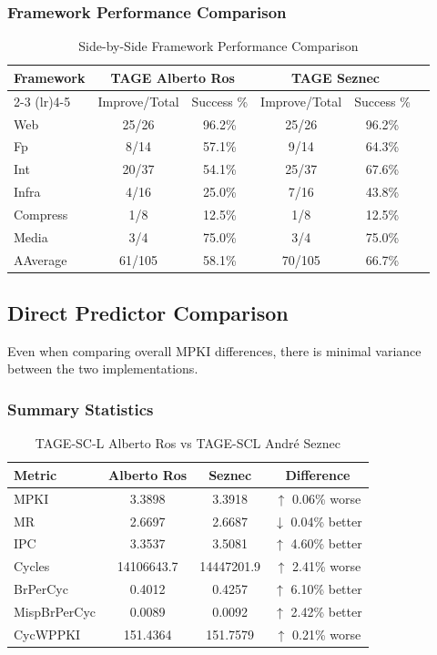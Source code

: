 \documentclass[11pt,a4paper]{article}
\begin{document}
\subsubsection{Framework Performance Comparison}

\begin{table}[h]
\centering
\caption{Side-by-Side Framework Performance Comparison}
\begin{tabular}{lccccc}
\toprule
\textbf{Framework} & \multicolumn{2}{c}{\textbf{TAGE Alberto Ros}} & \multicolumn{2}{c}{\textbf{TAGE Seznec}} \\
\cmidrule(lr){2-3} \cmidrule(lr){4-5}
 & Improve/Total & Success \% & Improve/Total & Success \% \\
\midrule
Web        & 25/26  & 96.2\%  & 25/26  & 96.2\% \\
Fp         & 8/14   & 57.1\%  & 9/14   & 64.3\% \\
Int        & 20/37  & 54.1\%  & 25/37  & 67.6\% \\
Infra      & 4/16   & 25.0\%  & 7/16   & 43.8\% \\
Compress   & 1/8    & 12.5\%  & 1/8    & 12.5\% \\
Media      & 3/4    & 75.0\%  & 3/4    & 75.0\% \\
\midrule
AAverage    & 61/105 & 58.1\% & 70/105 & 66.7\% \\
\bottomrule
\end{tabular}
\end{table}

\subsection{Direct Predictor Comparison}
Even when comparing overall MPKI differences, there is minimal variance between the two implementations.

\subsubsection{Summary Statistics}

\begin{table}[h]
\centering
\caption{TAGE-SC-L Alberto Ros vs TAGE-SCL André Seznec}
\begin{tabular}{lccc}
\toprule
\textbf{Metric} & \textbf{Alberto Ros} & \textbf{Seznec} & \textbf{Difference} \\
\midrule
MPKI         & 3.3898  & 3.3918  & $\uparrow$ 0.06\% worse \\
MR           & 2.6697  & 2.6687  & $\downarrow$ 0.04\% better \\
IPC          & 3.3537  & 3.5081  & $\uparrow$ 4.60\% better \\
Cycles       & 14106643.7 & 14447201.9 & $\uparrow$ 2.41\% worse \\
BrPerCyc     & 0.4012  & 0.4257  & $\uparrow$ 6.10\% better \\
MispBrPerCyc & 0.0089  & 0.0092  & $\uparrow$ 2.42\% better \\
CycWPPKI     & 151.4364 & 151.7579 & $\uparrow$ 0.21\% worse \\
\bottomrule
\end{tabular}
\end{table}
\end{document}
